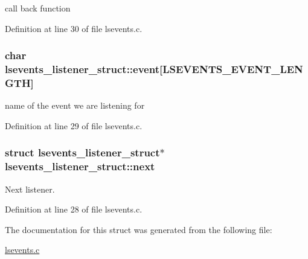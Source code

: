 call back function 



Definition at line 30 of file lsevents.\-c.

\hypertarget{structlsevents__listener__struct_a270117dccadeda0164592c753dae15a1}{
\subsubsection[{event}]{\setlength{\rightskip}{0pt plus 5cm}char lsevents\-\_\-listener\-\_\-struct\-::event\mbox{[}{\bf L\-S\-E\-V\-E\-N\-T\-S\-\_\-\-E\-V\-E\-N\-T\-\_\-\-L\-E\-N\-G\-T\-H}\mbox{]}}}\label{structlsevents__listener__struct_a270117dccadeda0164592c753dae15a1}


name of the event we are listening for 



Definition at line 29 of file lsevents.\-c.

\hypertarget{structlsevents__listener__struct_a8aed9196b0deab84e018b96c0cc59305}{
\subsubsection[{next}]{\setlength{\rightskip}{0pt plus 5cm}struct {\bf lsevents\-\_\-listener\-\_\-struct}$\ast$ lsevents\-\_\-listener\-\_\-struct\-::next}}\label{structlsevents__listener__struct_a8aed9196b0deab84e018b96c0cc59305}


Next listener. 



Definition at line 28 of file lsevents.\-c.



The documentation for this struct was generated from the following file\-:\begin{DoxyCompactItemize}
\item 
\hyperlink{lsevents_8c}{lsevents.\-c}\end{DoxyCompactItemize}
